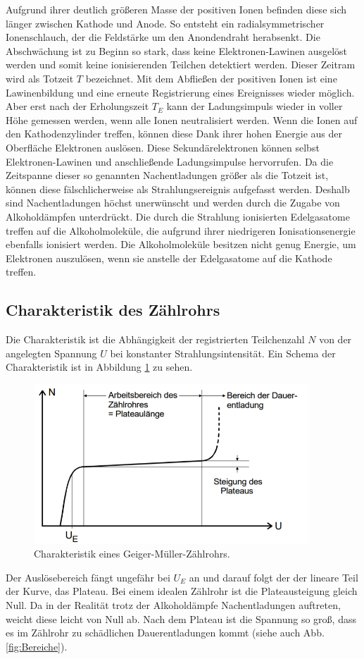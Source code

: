Aufgrund ihrer deutlich größeren Masse der positiven Ionen befinden diese sich länger zwischen Kathode und Anode.
So entsteht ein radialsymmetrischer Ionenschlauch, der die Feldstärke um den Anondendraht herabsenkt.
Die Abschwächung ist zu Beginn so stark, dass keine Elektronen-Lawinen ausgelöst werden und somit keine ionisierenden Teilchen detektiert werden.
Dieser Zeitram wird als Totzeit $T$ bezeichnet.
Mit dem Abfließen der positiven Ionen ist eine Lawinenbildung und eine erneute Registrierung eines Ereignisses wieder möglich.
Aber erst nach der Erholungszeit $T_E$ kann der Ladungsimpuls wieder in voller Höhe gemessen werden, wenn alle Ionen neutralisiert werden.
Wenn die Ionen auf den Kathodenzylinder treffen, können diese Dank ihrer hohen Energie aus der Oberfläche Elektronen auslösen.
Diese Sekundärelektronen können selbst Elektronen-Lawinen und anschließende Ladungsimpulse hervorrufen.
Da die Zeitspanne dieser so genannten Nachentladungen größer als die Totzeit ist, können diese fälschlicherweise als Strahlungsereignis aufgefasst werden.
Deshalb sind Nachentladungen höchst unerwünscht und werden durch die Zugabe von Alkoholdämpfen unterdrückt.
Die durch die Strahlung ionisierten Edelgasatome treffen auf die Alkoholmoleküle, die aufgrund ihrer niedrigeren Ionisationsenergie ebenfalls ionisiert werden.
Die Alkoholmoleküle besitzen nicht genug Energie, um Elektronen auszulösen, wenn sie anstelle der Edelgasatome auf die Kathode treffen. \cite{V703}

\subsection{Charakteristik des Zählrohrs}

Die Charakteristik ist die Abhängigkeit der registrierten Teilchenzahl $N$ von der angelegten Spannung $U$ bei konstanter Strahlungsintensität.
Ein Schema der Charakteristik ist in Abbildung \ref{fig:Charakteristik} zu sehen.
\begin{figure}
  \centering
  \includegraphics[height=6cm]{data/Charakteristik.png}
  \caption{Charakteristik eines Geiger-Müller-Zählrohrs. \cite{V703}}
  \label{fig:Charakteristik}
\end{figure}
Der Auslösebereich fängt ungefähr bei $U_E$ an und darauf folgt der der lineare Teil der Kurve, das Plateau.
Bei einem idealen Zählrohr ist die Plateausteigung gleich Null.
Da in der Realität trotz der Alkoholdämpfe Nachentladungen auftreten, weicht diese leicht von Null ab.
Nach dem Plateau ist die Spannung so groß, dass es im Zählrohr zu schädlichen Dauerentladungen kommt (siehe auch Abb. \ref{fig:Bereiche}). \cite{V703}
